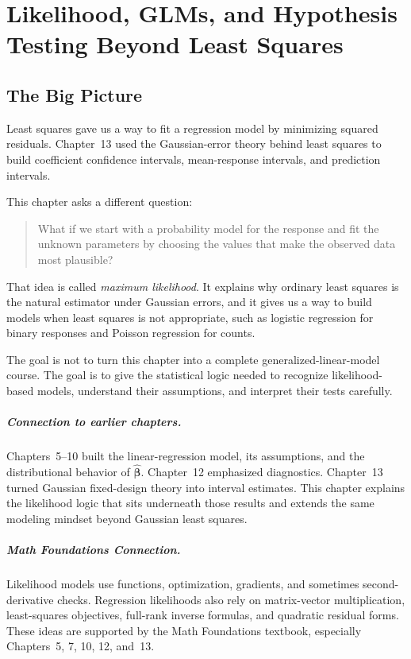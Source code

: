 \chapter[Likelihood, GLMs, and Hypothesis Testing]{Likelihood, GLMs, and Hypothesis Testing Beyond Least Squares}
\label{chap:likelihood-glms-hypothesis-testing}

\section{The Big Picture}

Least squares gave us a way to fit a regression model by minimizing squared residuals.  Chapter~13 used the Gaussian-error theory behind least squares to build coefficient confidence intervals, mean-response intervals, and prediction intervals.

This chapter asks a different question:
\begin{quote}
  What if we start with a probability model for the response and fit the unknown parameters by choosing the values that make the observed data most plausible?
\end{quote}
That idea is called \emph{maximum likelihood}.  It explains why ordinary least squares is the natural estimator under Gaussian errors, and it gives us a way to build models when least squares is not appropriate, such as logistic regression for binary responses and Poisson regression for counts.

The goal is not to turn this chapter into a complete generalized-linear-model course.  The goal is to give the statistical logic needed to recognize likelihood-based models, understand their assumptions, and interpret their tests carefully.

\paragraph{Connection to earlier chapters.}
Chapters~5--10 built the linear-regression model, its assumptions, and the distributional behavior of \(\widehat{\boldsymbol{\beta}}\).  Chapter~12 emphasized diagnostics.  Chapter~13 turned Gaussian fixed-design theory into interval estimates.  This chapter explains the likelihood logic that sits underneath those results and extends the same modeling mindset beyond Gaussian least squares.

\paragraph{Math Foundations Connection.}
Likelihood models use functions, optimization, gradients, and sometimes second-derivative checks.  Regression likelihoods also rely on matrix-vector multiplication, least-squares objectives, full-rank inverse formulas, and quadratic residual forms.  These ideas are supported by the Math Foundations textbook, especially Chapters~5, 7, 10, 12, and~13.

